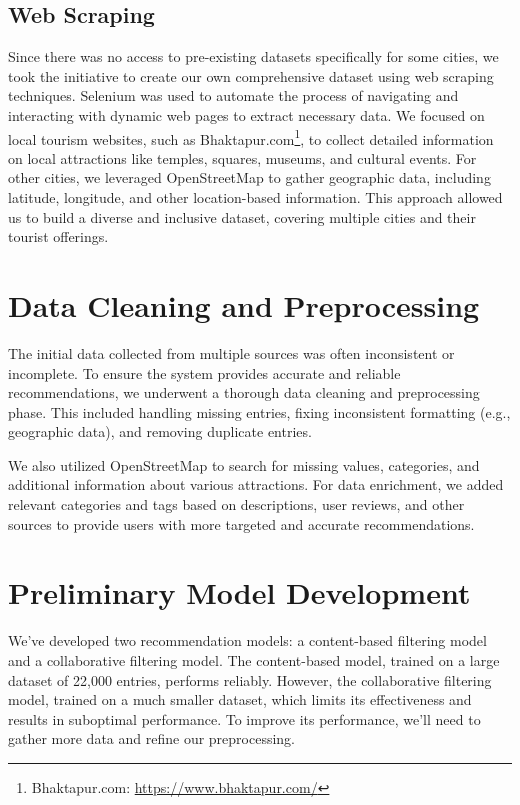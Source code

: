 \subsection{Web Scraping}
Since there was no access to pre-existing datasets specifically for some cities, we took the initiative to create our own comprehensive dataset using web scraping techniques. Selenium was used to automate the process of navigating and interacting with dynamic web pages to extract necessary data. We focused on local tourism websites, such as Bhaktapur.com\footnote{Bhaktapur.com: \url{https://www.bhaktapur.com/}}, to collect detailed information on local attractions like temples, squares, museums, and cultural events. For other cities, we leveraged OpenStreetMap to gather geographic data, including latitude, longitude, and other location-based information. This approach allowed us to build a diverse and inclusive dataset, covering multiple cities and their tourist offerings.

\section{Data Cleaning and Preprocessing}

The initial data collected from multiple sources was often inconsistent or incomplete. To ensure the system provides accurate and reliable recommendations, we underwent a thorough data cleaning and preprocessing phase. This included handling missing entries, fixing inconsistent formatting (e.g., geographic data), and removing duplicate entries.

We also utilized OpenStreetMap to search for missing values, categories, and additional information about various attractions. For data enrichment, we added relevant categories and tags based on descriptions, user reviews, and other sources to provide users with more targeted and accurate recommendations.



\section{Preliminary Model Development}
We’ve developed two recommendation models: a content-based filtering model and a collaborative filtering model. The content-based model, trained on a large dataset of 22,000 entries, performs reliably. However, the collaborative filtering model, trained on a much smaller dataset,  which limits its effectiveness and results in suboptimal performance. To improve its performance, we’ll need to gather more data and refine our preprocessing.



